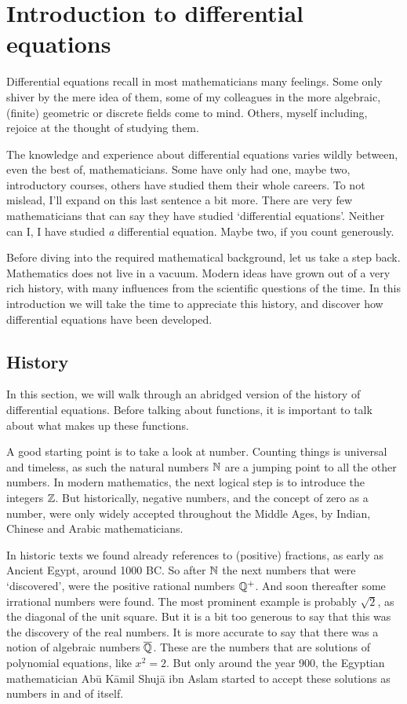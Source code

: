 

\chapter{Introduction to differential equations}

Differential equations recall in most mathematicians many feelings. Some only shiver by the mere idea of them, some of my colleagues in the more algebraic, (finite) geometric or discrete fields come to mind. Others, myself including, rejoice at the thought of studying them.

The knowledge and experience about differential equations varies wildly between, even the best of, mathematicians. Some have only had one, maybe two, introductory courses, others have studied them their whole careers. To not mislead, I'll expand on this last sentence a bit more. There are very few mathematicians that can say they have studied `differential equations'. Neither can I, I have studied \emph{a} differential equation. Maybe two, if you count generously.

Before diving into the required mathematical background, let us take a step back. Mathematics does not live in a vacuum. Modern ideas have grown out of a very rich history, with many influences from the scientific questions of the time. In this introduction we will take the time to appreciate this history, and discover how differential equations have been developed.

\section{History}

In this section, we will walk through an abridged version of the history of differential equations. Before talking about functions, it is important to talk about what makes up these functions.

A good starting point is to take a look at number. Counting things is universal and timeless, as such the natural numbers $\mathbb{N}$ are a jumping point to all the other numbers. In modern mathematics, the next logical step is to introduce the integers $\mathbb{Z}$. But historically, negative numbers, and the concept of zero as a number, were only widely accepted throughout the Middle Ages, by Indian, Chinese and Arabic mathematicians.

In historic texts we found already references to (positive) fractions, as early as Ancient Egypt, around 1000 BC. So after $\mathbb{N}$ the next numbers that were `discovered', were the positive rational numbers $\mathbb{Q}^+$. And soon thereafter some irrational numbers were found. The most prominent example is probably $\sqrt{2}$, as the diagonal of the unit square. But it is a bit too generous to say that this was the discovery of the real numbers. It is more accurate to say that there was a notion of algebraic numbers $\overline{\mathbb{Q}}$. These are the numbers that are solutions of polynomial equations, like $x^2 = 2$. But only around the year 900, the Egyptian mathematician Abū Kāmil Shujā ibn Aslam started to accept these solutions as numbers in and of itself.

